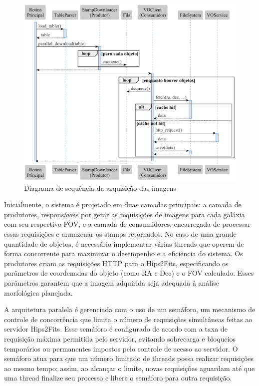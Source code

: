 \begin{figure}[!ht]
  \centering
  \caption{Diagrama de sequência da arquisição das imagens}
  \label{fig:stamps-sequence}
  \includegraphics[width=\linewidth]{diagrams/plots/sequence.pdf}
\end{figure}


Inicialmente, o sistema é projetado em duas camadas principais: a camada de produtores, responsáveis por gerar as requisições de imagens para cada galáxia com seu respectivo FOV, e a camada de consumidores, encarregada de processar essas requisições e armazenar os stamps retornados. No caso de uma grande quantidade de objetos, é necessário implementar várias threads que operem de forma concorrente para maximizar o desempenho e a eficiência do sistema. Os produtores criam as requisições HTTP para o Hips2Fits, especificando os parâmetros de coordenadas do objeto (como RA e Dec) e o FOV calculado. Esses parâmetros garantem que a imagem adquirida seja adequada à análise morfológica planejada.

A arquitetura paralela é gerenciada com o uso de um semáforo, um mecanismo de controle de concorrência que limita o número de requisições simultâneas feitas ao servidor Hips2Fits. Esse semáforo é configurado de acordo com a taxa de requisição máxima permitida pelo servidor, evitando sobrecarga e bloqueios temporários ou permanentes impostos pelo controle de acesso ao servidor. O semáforo atua para que um número limitado de threads possa realizar requisições ao mesmo tempo; assim, ao alcançar o limite, novas requisições aguardam até que uma thread finalize seu processo e libere o semáforo para outra requisição.

